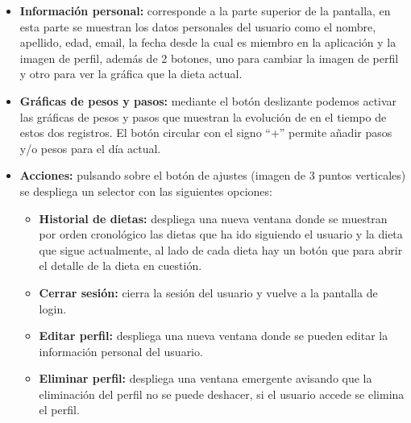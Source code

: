 \begin{itemize}
    \item \textbf{Información personal:} corresponde a la parte superior de la pantalla, en esta parte se muestran  los datos personales del usuario como el nombre, apellido, edad, email, la fecha desde la cual es miembro en la aplicación y la imagen de perfil, además de 2 botones, uno para cambiar la imagen de perfil y otro para ver la gráfica que la dieta actual.
    \item \textbf{Gráficas de pesos y pasos:} mediante el botón deslizante podemos activar las gráficas de pesos y pasos que muestran la evolución de en el tiempo de estos dos registros. El botón circular con el signo “+” permite añadir pasos y/o pesos para el día actual.
    \item \textbf{Acciones:} pulsando sobre el botón de ajustes (imagen de 3 puntos verticales) se despliega un selector con las siguientes opciones:
        \begin{itemize}
        \item \textbf{Historial de dietas:} despliega una nueva ventana donde se muestran por orden cronológico las dietas que ha ido siguiendo el usuario y la dieta que sigue actualmente, al lado de cada dieta hay un botón que para abrir el detalle de la dieta en cuestión.
        \item \textbf{Cerrar sesión:} cierra la sesión del usuario y vuelve a la pantalla de login.
        \item \textbf{Editar perfil:} despliega una nueva ventana donde se pueden editar la información personal del usuario.
        \item \textbf{Eliminar perfil:} despliega una ventana emergente avisando que la eliminación del perfil no se puede deshacer, si el usuario accede se elimina el perfil.
        \end{itemize}
\end{itemize}


